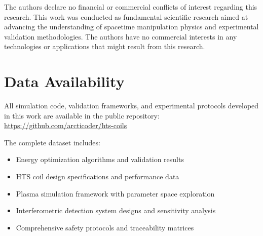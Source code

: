\documentclass[12pt,a4paper]{article}
\begin{document}
The authors declare no financial or commercial conflicts of interest regarding this research. This work was conducted as fundamental scientific research aimed at advancing the understanding of spacetime manipulation physics and experimental validation methodologies. The authors have no commercial interests in any technologies or applications that might result from this research.

\section*{Data Availability}

All simulation code, validation frameworks, and experimental protocols developed in this work are available in the public repository: \url{https://github.com/arcticoder/hts-coils}

The complete dataset includes:
\begin{itemize}
\item Energy optimization algorithms and validation results
\item HTS coil design specifications and performance data
\item Plasma simulation framework with parameter space exploration
\item Interferometric detection system designs and sensitivity analysis
\item Comprehensive safety protocols and traceability matrices
\end{itemize}
\end{document}
